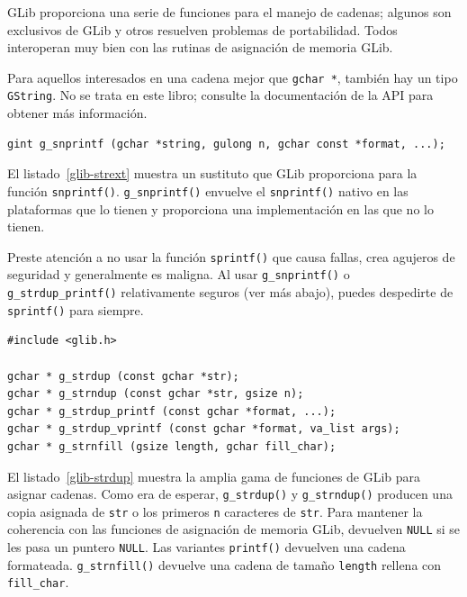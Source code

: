 GLib proporciona una serie de funciones para el manejo de cadenas; algunos son exclusivos de GLib y otros resuelven problemas de portabilidad. Todos interoperan muy bien con las rutinas de asignación de memoria GLib.

Para aquellos interesados en una cadena mejor que \lstinline{gchar *}, también hay un tipo \lstinline{GString}. No se trata en este libro; consulte la documentación de la API para obtener más información.

\begin{lstlisting}[style=GLib/GTK, caption={Envoltorio de portabilidad}, label=glib-strext]
gint g_snprintf (gchar *string, gulong n, gchar const *format, ...);
\end{lstlisting}

El listado~\ref{glib-strext} muestra un sustituto que GLib proporciona para la función \lstinline{snprintf()}. \lstinline{g_snprintf()} envuelve el \lstinline{snprintf()} nativo en las plataformas que lo tienen y proporciona una implementación en las que no lo tienen.

Preste atención a no usar la función \lstinline{sprintf()} que causa fallas, crea agujeros de seguridad y generalmente es maligna. Al usar \lstinline{g_snprintf()} o \lstinline{g_strdup_printf()} relativamente seguros (ver más abajo), puedes despedirte de \lstinline{sprintf()} para siempre.

\begin{lstlisting}[style=GLib/GTK, caption={Asignar cadenas}, label=glib-strdup]
#include <glib.h>

gchar * g_strdup (const gchar *str);
gchar * g_strndup (const gchar *str, gsize n);
gchar * g_strdup_printf (const gchar *format, ...);
gchar * g_strdup_vprintf (const gchar *format, va_list args);
gchar * g_strnfill (gsize length, gchar fill_char);
\end{lstlisting}

El listado~\ref{glib-strdup} muestra la amplia gama de funciones de GLib para asignar cadenas. Como era de esperar, \lstinline{g_strdup()} y \lstinline{g_strndup()} producen una copia asignada de \lstinline{str} o los primeros \lstinline{n} caracteres de \lstinline{str}. Para mantener la coherencia con las funciones de asignación de memoria GLib, devuelven \lstinline{NULL} si se les pasa un puntero \lstinline{NULL}. Las variantes \lstinline{printf()} devuelven una cadena formateada. \lstinline{g_strnfill()} devuelve una cadena de tamaño \lstinline{length} rellena con \lstinline{fill_char}.

